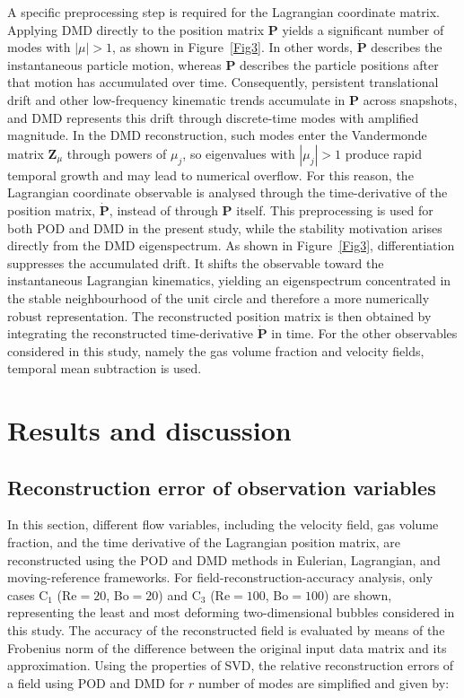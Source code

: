 \documentclass[a4paper,fleqn]{cas-sc}
\begin{document}
	A specific preprocessing step is required for the Lagrangian coordinate matrix. Applying DMD directly to the position matrix $\mathbf{P}$ yields a significant number of modes with $|\mu|>1$, as shown in Figure~\ref{Fig3}. In other words, $\dot{\mathbf{P}}$ describes the instantaneous particle motion, whereas $\mathbf{P}$ describes the particle positions after that motion has accumulated over time. Consequently, persistent translational drift and other low-frequency kinematic trends accumulate in $\mathbf{P}$ across snapshots, and DMD represents this drift through discrete-time modes with amplified magnitude. In the DMD reconstruction, such modes enter the Vandermonde matrix $\mathbf{Z}_{\mu}$ through powers of $\mu_j$, so eigenvalues with $|\mu_j|>1$ produce rapid temporal growth and may lead to numerical overflow. For this reason, the Lagrangian coordinate observable is analysed through the time-derivative of the position matrix, $\dot{\mathbf{P}}$, instead of through $\mathbf{P}$ itself. This preprocessing is used for both POD and DMD in the present study, while the stability motivation arises directly from the DMD eigenspectrum. As shown in Figure~\ref{Fig3}, differentiation suppresses the accumulated drift. It shifts the observable toward the instantaneous Lagrangian kinematics, yielding an eigenspectrum concentrated in the stable neighbourhood of the unit circle and therefore a more numerically robust representation. The reconstructed position matrix is then obtained by integrating the reconstructed time-derivative $\dot{\mathbf{P}}$ in time. For the other observables considered in this study, namely the gas volume fraction and velocity fields, temporal mean subtraction is used.
	
	\section{Results and discussion}
	\label{Results and discussion}
	
	
	\subsection{Reconstruction error of observation variables}
	
	In this section, different flow variables, including the velocity field, gas volume fraction, and the time derivative of the Lagrangian position matrix, are reconstructed using the POD and DMD methods in Eulerian, Lagrangian, and moving-reference frameworks. For field-reconstruction-accuracy analysis, only cases C$_1$ (Re$=20$, Bo$=20$) and C$_3$ (Re$=100$, Bo$=100$) are shown, representing the least and most deforming two-dimensional bubbles considered in this study. The accuracy of the reconstructed field is evaluated by means of the Frobenius norm of the difference between the original input data matrix and its approximation. Using the properties of SVD, the relative reconstruction errors of a field using POD and DMD for $r$ number of modes are simplified and given by:
	
\end{document}
